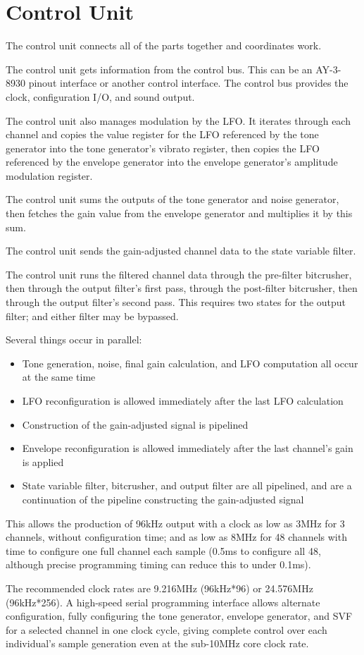 \section{Control Unit}

The control unit connects all of the parts together and coordinates work.

The control unit gets information from the control bus.  This can be an AY-3-8930 pinout interface or another control interface.  The control bus provides the clock, configuration I/O, and sound output.

The control unit also manages modulation by the LFO.  It iterates through each channel and copies the value register for the LFO referenced by the tone generator into the tone generator's vibrato register, then copies the LFO referenced by the envelope generator into the envelope generator's amplitude modulation register.

The control unit sums the outputs of the tone generator and noise generator, then fetches the gain value from the envelope generator and multiplies it by this sum.

The control unit sends the gain-adjusted channel data to the state variable filter.

The control unit runs the filtered channel data through the pre-filter bitcrusher, then through the output filter's first pass, through the post-filter bitcrusher, then through the output filter's second pass.  This requires two states for the output filter; and either filter may be bypassed.

Several things occur in parallel:

\begin{itemize}
	\item Tone generation, noise, final gain calculation, and LFO computation all occur at the same time
	\item LFO reconfiguration is allowed immediately after the last LFO calculation
	\item Construction of the gain-adjusted signal is pipelined
	\item Envelope reconfiguration is allowed immediately after the last channel's gain is applied
	\item State variable filter, bitcrusher, and output filter are all pipelined, and are a continuation of the pipeline constructing the gain-adjusted signal 
\end{itemize}

This allows the production of 96kHz output with a clock as low as 3MHz for 3 channels, without configuration time; and as low as 8MHz for 48 channels with time to configure one full channel each sample (0.5ms to configure all 48, although precise programming timing can reduce this to under 0.1ms).

The recommended clock rates are 9.216MHz (96kHz*96) or 24.576MHz (96kHz*256).  A high-speed serial programming interface allows alternate configuration, fully configuring the tone generator, envelope generator, and SVF for a selected channel in one clock cycle, giving complete control over each individual's sample generation even at the sub-10MHz core clock rate.